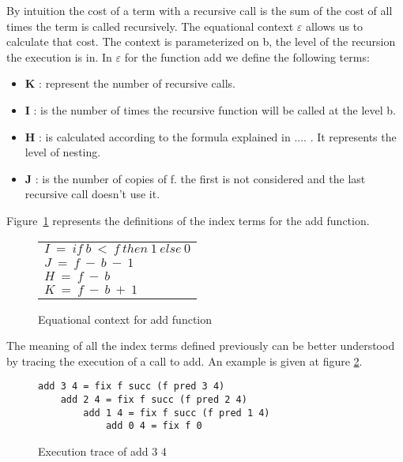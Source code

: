 \documentclass[a4paper,12pt]{article}
\begin{document}
By intuition the cost of a term with a recursive call is the sum of
the cost of all times the term is called recursively. The equational
context $\varepsilon$ allows us to calculate that cost. The context is
parameterized on b, the level of the recursion the execution is in. In 
$\varepsilon$ for the function add we define the following terms:


\begin{itemize}

\item \textbf{K} : represent the number of recursive calls.
\item \textbf{I} : is the number of times the recursive function will be called at
the level b. 
\item \textbf{H} : is calculated according to the formula explained in .... . It
represents the level of nesting.
\item \textbf{J} : is the number of copies of f. the first is not considered and
the last recursive call doesn't use it.

\end{itemize}

Figure~\ref{definitionindexterms} represents the definitions of the index
terms for the add function.


\begin{figure}[ht]
\begin{center}
  \begin{tabular}{l}
    $I~=~if~b~<~f~then~1~else~0$ \\

    $J~=~f~-~b~-~1$ \\

    $H~=~f~-~b$ \\

    $K~=~f~-~b~+~1$ \\
  \end{tabular}
\end{center}
\caption{Equational context for add function}
\label{definitionindexterms}
\end{figure}

The meaning of all the index terms defined previously can be better
understood by tracing the execution of a call to add. An example is
given at figure \ref{exectrace}. 


\begin{figure}
\label{exectrace}
\begin{center}
\begin{verbatim}
add 3 4 = fix f succ (f pred 3 4)
    add 2 4 = fix f succ (f pred 2 4)
        add 1 4 = fix f succ (f pred 1 4)
            add 0 4 = fix f 0 
\end{verbatim}
\end{center}

\caption{Execution trace of add 3 4}
\end{figure}
\end{document}
